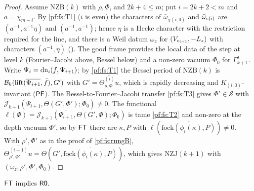 \begin{proof}
Assume $\mathrm{NZB}(k)$ with $\rho,\Phi$, and $2k+4\le m$; put $i=2k+2<m$ and $a=\chi_{m-i}$. By \ref{pf:fs:T1} ($i$ is even) the
characters of $\bar\omega_{\chi(i,0)}$ and $\bar\omega_{\mathrm{c}(i)}$ are $(a^{-1},a^{-1}\eta)$ and $(a^{-1},a^{-1})$; hence $\eta$ is a Hecke
character with the restriction required for the line, and there is a Weil datum $\omega_z$ for $(V_{\mathrm{c}_{i+1}},-L_z)$ with characters
$(a^{-1},\eta)$ (). The good frame
provides the local data of the step at level $k$ (Fourier--Jacobi above, Bessel below) and a non-zero vacuum $\Phi_0$ for $\Gamma^L_{k+1}$.
Write $\Psi_i=\mathrm{dn}_i(f,\Psi_{i+1})$; by \ref{pf:fs:T1} the Bessel period of $\mathrm{NZB}(k)$ is
$\mathcal B_k(\mathrm{lift}(\overline{\Psi_{i+1}},\bar f),G')$ with $G'=\overline{\Theta^{(i)}_{\rho,\Phi}u}$, which is rapidly decreasing and
$K_{(i,0)}$-invariant ($\mathsf{PF}$). The Bessel-to-Fourier--Jacobi transfer \ref{pf:fs:T3} gives $\Phi'\in\mathcal S$ with
$\mathcal J_{k+1}(\overline{\Psi_{i+1}},\Theta(G',\Phi');\Phi_0)\ne0$. The functional $\ell(\Phi)=\mathcal J_{k+1}(\overline{\Psi_{i+1}},\Theta(G',\Phi);\Phi_0)$
is tame \ref{pf:fs:T2} and non-zero at the depth vacuum $\Phi'$, so by $\mathsf{FT}$ there are $\kappa,P$ with
$\ell(\overline{\mathrm{fock}(\phi_i(\kappa),P)})\ne0$. With $\rho',\Phi'$ as in the proof of \cref{pf:fs:rungB},
$\overline{\Theta^{(i+1)}_{\rho',\Phi'}u}=\Theta(G',\overline{\mathrm{fock}(\phi_i(\kappa),P)})$, which gives $\mathrm{NZJ}(k+1)$ with
$(\omega_z,\rho',\Phi',\Phi_0)$.
\end{proof}

\begin{proposition}\label{pf:fs:rung0}
$\mathsf{FT}$ implies $\mathsf{R0}$.
\end{proposition}

